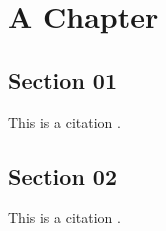 \chapter{A Chapter}
\lipsum[1-3]
\section{Section 01}
This is a citation \cite{grand}.
\lipsum[2-5]

\section{Section 02}
This is a citation \cite{grand}.
\lipsum[2-3]
